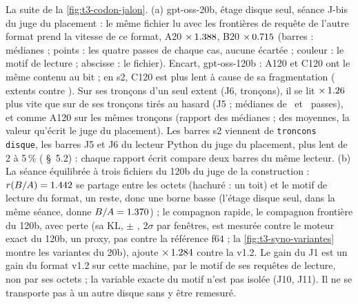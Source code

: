  {La suite de la \cref{fig:t3-codon-jalon}. (a) gpt-oss-20b, étage disque seul, séance J-bis du juge du
   placement : le même fichier lu avec les frontières de requête de l'autre format prend la vitesse de ce format,
   A20 $\times\,\CodonNum{\CodonNMotifRA}$, B20 $\times\,\CodonNum{\CodonNMotifRB}$ (barres : médianes ; points :
   les quatre passes de chaque cas, aucune écartée ; couleur : le motif de lecture ; abscisse : le fichier). Encart,
   gpt-oss-120b : A120 et C120 ont le même contenu au bit ; en s2, C120 est plus lent à cause de sa fragmentation
   (\CodonNum{\CodonNExtentsC} extents contre \CodonNum{\CodonNExtentsA}). Sur ses tronçons d'un seul extent (J6,
   \CodonNum{\CodonNEncartTiresJsix} tronçons), il se lit $\times\,\CodonNum{\CodonNEncartFrag}$ plus vite que sur
   \CodonNum{\CodonNEncartTiresJcinq} de ses tronçons tirés au hasard (J5 ; médianes de \CodonNEncartPassesJcinq\ et
   \CodonNEncartPassesJsix\ passes), et comme A120 sur les mêmes tronçons (rapport \CodonNum{\CodonNEncartCsurA}
   des médianes ; \CodonNum{\CodonNEncartCsurAMoy} des moyennes, la valeur qu'écrit le juge du placement). Les
   barres s2 viennent de \texttt{troncons disque}, les barres J5 et J6 du lecteur Python du juge du placement, plus
   lent de 2 à 5\,\% ( §~5.2) : chaque rapport écrit compare deux barres du
   même lecteur. (b) La séance équilibrée à trois fichiers du 120b du juge de la construction :
   $r(B/A)=\CodonNum{\CodonNCascRBA}$ se partage entre les octets (hachuré : un toit) et le motif de lecture du
   format, un reste, donc une borne basse (l'étage disque seul, dans la même séance, donne
   $B/A=\CodonNum{\CodonNCascDisqueBA}$) ; le compagnon rapide, le compagnon frontière du 120b, avec perte (sa KL,
   \CodonNum{\CodonNCompagnonKL} $\pm$ \CodonNum{\CodonNCompagnonDeuxSigma}, $2\sigma$ par fenêtres, est mesurée
   contre le moteur exact du 120b, un proxy, pas contre la référence f64 ; la \cref{fig:t3-syno-variantes} montre
   les variantes du 20b), ajoute $\times\,\CodonNum{\CodonNCascRRB}$ contre la v1.2. Le gain du J1 est un gain du format v1.2 sur cette machine, par le motif de ses requêtes de
   lecture, non par ses octets ; la variable exacte du motif n'est pas isolée (J10, J11). Il ne se transporte pas à
   un autre disque sans y être remesuré.}

